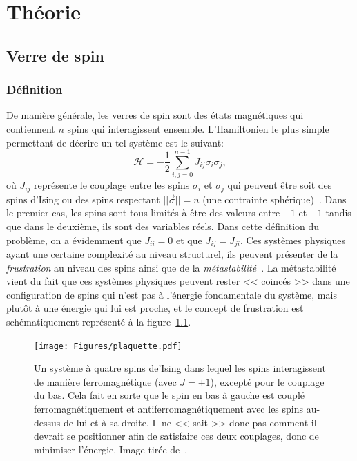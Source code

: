 \part{Théorie}\label{part:theory}

\chapter{Verre de spin} \label{ch:spin-glass}
\section{Définition} \label{sec:spin-glass}
De manière générale, les verres de spin sont des états magnétiques qui contiennent $n$ spins qui interagissent ensemble.
L'Hamiltonien le plus simple permettant de décrire un tel système est le suivant:
\begin{equation}
    \mathcal{H} = -\frac{1}{2}\sum_{i,j = 0}^{n-1}J_{ij}\sigma_i\sigma_j,
\end{equation}
où $J_{ij}$ représente le couplage entre les spins $\sigma_i$ et $\sigma_j$ qui peuvent être soit des spins d'Ising ou des spins respectant $||\vec{\sigma}|| = n$ (une contrainte sphérique)~\cite{EAspinglass, spherical-model-spinglass}.
Dans le premier cas, les spins sont tous limités à être des valeurs entre $+1$ et $-1$ tandis que dans le deuxième, ils sont des variables réels.
Dans cette définition du problème, on a évidemment que $J_{ii} = 0$ et que $J_{ij} = J_{ji}$.
Ces systèmes physiques ayant une certaine complexité au niveau structurel, ils peuvent présenter de la \emph{frustration} au niveau des spins ainsi que de la \emph{métastabilité}~\cite{stein2013spin}.
La métastabilité vient du fait que ces systèmes physiques peuvent rester << coincés >> dans une configuration de spins qui n'est pas à l'énergie fondamentale du système, mais plutôt à une énergie qui lui est proche, et le concept de frustration est schématiquement représenté à la figure~\ref{fig:spin-glass-frustration}.
\begin{figure}[h]
    \centering
    \texttt{[image: Figures/plaquette.pdf]}
    \caption[Un système à quatre spins d'Ising dans lequel les spins interagissent de manière ferromagnétique (avec $J = +1$), excepté pour le couplage du bas.]{Un système à quatre spins de'Ising dans lequel les spins interagissent de manière ferromagnétique (avec $J = +1$), excepté pour le couplage du bas. Cela fait en sorte que le spin en bas à gauche est couplé ferromagnétiquement et antiferromagnétiquement avec les spins au-dessus de lui et à sa droite. Il ne << sait >> donc pas comment il devrait se positionner afin de satisfaire ces deux couplages, donc de minimiser l'énergie. Image tirée de~\protect\cite{altieri2023introduction}.}
    \label{fig:spin-glass-frustration}
\end{figure}
